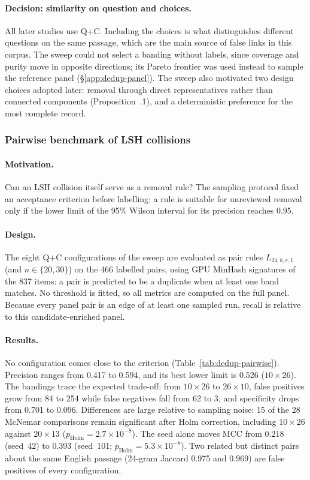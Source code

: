 \paragraph{Decision: similarity on question and choices.} All later studies
use Q+C. Including the choices is what distinguishes different questions on
the same passage, which are the main source of false links in this corpus.
The sweep could not select a banding without labels, since coverage and
purity move in opposite directions; its Pareto frontier was used instead to
sample the reference panel (\S\ref{app:dedup-panel}). The sweep also
motivated two design choices adopted later: removal through direct
representatives rather than connected components
(Proposition~\thesection.1), and a deterministic preference for the most
complete record.

\subsubsection{Pairwise benchmark of LSH collisions}
\label{app:dedup-fuzzy-pairwise}

\paragraph{Motivation.} Can an LSH collision itself serve as a removal rule?
The sampling protocol fixed an acceptance criterion before labelling: a rule
is suitable for unreviewed removal only if the lower limit of the 95\% Wilson
interval for its precision reaches 0.95.

\paragraph{Design.} The eight Q+C configurations of the sweep are evaluated
as pair rules $L_{24,b,r,1}$ (and $n\in\{20,30\}$) on the 466 labelled pairs,
using GPU MinHash signatures of the 837 items: a pair is predicted to be a
duplicate when at least one band matches. No threshold is fitted, so all
metrics are computed on the full panel. Because every panel pair is an edge
of at least one sampled run, recall is relative to this candidate-enriched
panel.

\paragraph{Results.} No configuration comes close to the criterion
(Table~\ref{tab:dedup-pairwise}). Precision ranges from 0.417 to 0.594, and
its best lower limit is 0.526 ($10{\times}26$). The bandings trace the
expected trade-off: from $10{\times}26$ to $26{\times}10$, false positives
grow from 84 to 254 while false negatives fall from 62 to 3, and specificity
drops from 0.701 to 0.096. Differences are large relative to sampling noise:
15 of the 28 McNemar comparisons remain significant after Holm correction,
including $10{\times}26$ against $20{\times}13$ ($p_{\mathrm{Holm}} = 2.7
\times 10^{-8}$). The seed alone moves MCC from 0.218 (seed~42) to 0.393
(seed~101; $p_{\mathrm{Holm}} = 5.3 \times 10^{-8}$). Two related but
distinct pairs about the same English passage (24-gram Jaccard 0.975 and
0.969) are false positives of every configuration.

